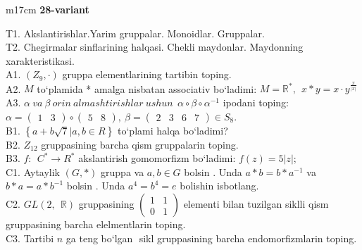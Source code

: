 \documentclass{article}
\begin{document}
\begin{tabular}{m{17cm}}
\textbf{28-variant}
\newline

T1. Akslantirishlar.Yarim gruppalar. Monoidlar. Gruppalar. \\
T2. Chegirmalar sinflarining halqasi. Chekli maydonlar. Maydonning xarakteristikasi. \\
A1. \(\left( Z_{9}, \cdot \right)\) gruppa elementlarining tartibin toping. \\
A2. \(M\) to`plamida * amalga nisbatan associativ bo`ladimi: \(M = \mathbb{R}^{*},\ \ x*y = x \cdot y^{\frac{x}{|x|}}\) \\
A3. \(\alpha\ va\ \beta\ orin\ almashtirishlar\ ushun\ \ \alpha \circ \beta \circ \alpha^{- 1}\) ipodani toping:\(\alpha = \begin{pmatrix}
1 & 3
\end{pmatrix} \circ \begin{pmatrix}
5 & 8
\end{pmatrix},\ \beta = \begin{pmatrix}
2 & 3 & 6 & 7
\end{pmatrix} \in S_{8}\). \\
B1. \(\left\{ a + b\sqrt{7}|a,b \in R \right\}\) to`plami halqa bo`ladimi? \\
B2. \(Z_{12}\) gruppasining barcha qism gruppalarin toping. \\
B3. \(f:\ \ C^{*} \rightarrow R^{*}\) akslantirish gomomorfizm bo`ladimi: \(f(z) = 5|z|;\) \\
C1. Aytaylik \((G,*)\) gruppa va \(a,b \in G\) bo\textquotesingle lsin . Unda \(a*b = b*a^{- 1}\) va \(b*a = a*b^{- 1}\) bo\textquotesingle lsin . Unda \(a^{4} = b^{4} = e\) bolishin isbotlang. \\
C2. \(GL(2,\mathbb{\ \ R})\) gruppasining \(\begin{pmatrix}
1 & 1 \\
0 & 1
\end{pmatrix}\) elementi bilan tuzilgan siklli qism gruppasining barcha elelmentlarin toping. \\
C3. Tartibi \(n\) ga teng bo`lgan \(< a >\) sikl gruppasining barcha endomorfizmlarin toping. \\

\end{tabular}
\vspace{1cm}
\end{document}
